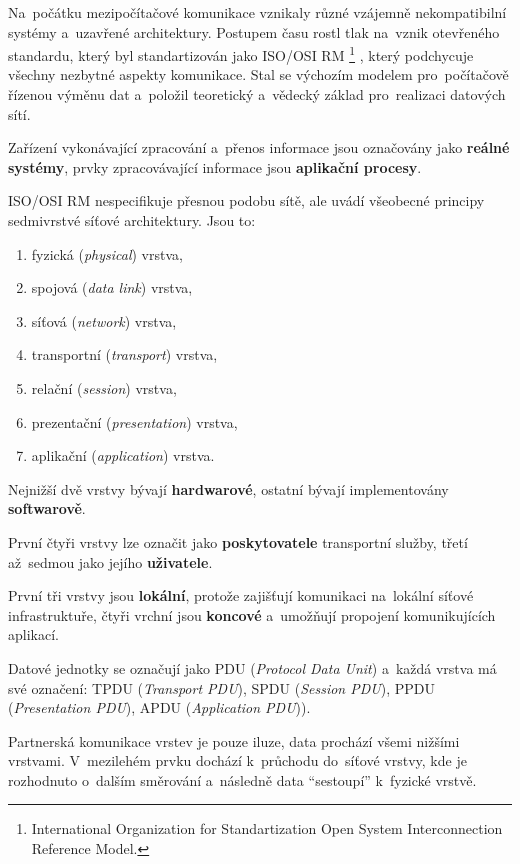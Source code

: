 Na~počátku mezipočítačové komunikace vznikaly různé vzájemně nekompatibilní systémy a~uzavřené architektury. Postupem času rostl tlak na~vznik otevřeného standardu, který byl standartizován jako ISO/OSI RM%
\footnote{International Organization for Standartization Open System Interconnection Reference Model.}%
, který podchycuje všechny nezbytné aspekty komunikace. Stal se výchozím modelem pro~počítačově řízenou výměnu dat a~položil teoretický a~vědecký základ pro~realizaci datových sítí.

Zařízení vykonávající zpracování a~přenos informace jsou označovány jako \textbf{reálné systémy}, prvky zpracovávající informace jsou \textbf{aplikační procesy}.

ISO/OSI RM nespecifikuje přesnou podobu sítě, ale uvádí všeobecné principy sedmivrstvé síťové architektury. Jsou to:

\begin{enumerate}
	\item fyzická (\emph{physical}) vrstva,
	\item spojová (\emph{data link}) vrstva,
	\item síťová (\emph{network}) vrstva,
	\item transportní (\emph{transport}) vrstva,
	\item relační (\emph{session}) vrstva,
	\item prezentační (\emph{presentation}) vrstva,
	\item aplikační (\emph{application}) vrstva.
\end{enumerate}

Nejnižší dvě vrstvy bývají \textbf{hardwarové}, ostatní bývají implementovány \textbf{softwarově}.

První čtyři vrstvy lze označit jako \textbf{poskytovatele} transportní služby, třetí až~sedmou jako jejího \textbf{uživatele}.

První tři vrstvy jsou \textbf{lokální}, protože zajišťují komunikaci na~lokální síťové infrastruktuře, čtyři vrchní jsou \textbf{koncové} a~umožňují propojení komunikujících aplikací.

Datové jednotky se označují jako PDU (\emph{Protocol Data Unit}) a~každá vrstva má své označení: TPDU (\emph{Transport PDU}), SPDU (\emph{Session PDU}), PPDU (\emph{Presentation PDU}), APDU (\emph{Application PDU})).

Partnerská komunikace vrstev je pouze iluze, data prochází všemi nižšími vrstvami. V~mezilehém prvku dochází k~průchodu do~síťové vrstvy, kde je rozhodnuto o~dalším směrování a~následně data \enquote{sestoupí} k~fyzické vrstvě.

